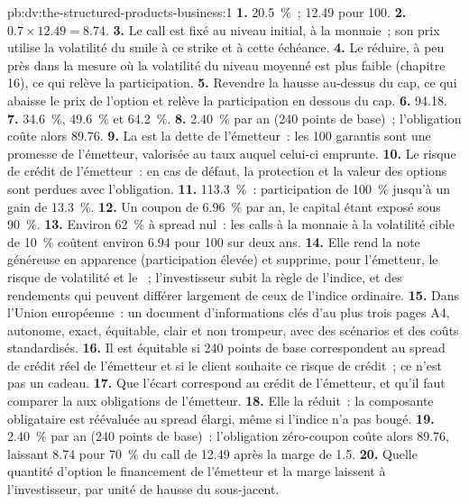 \begin{solution}{pb:dv:the-structured-products-business:1}
\textbf{1.} 20.5~\%~; 12.49 pour 100.
\textbf{2.} $0.7\times12.49=8.74$.
\textbf{3.} Le call est fixé au niveau initial, à la monnaie~; son prix utilise la volatilité du smile à ce strike et à cette échéance.
\textbf{4.} Le réduire, à peu près dans la mesure où la volatilité du niveau moyenné est plus faible (chapitre 16), ce qui relève la participation.
\textbf{5.} Revendre la hausse au-dessus du cap, ce qui abaisse le prix de l'option et relève la participation en dessous du cap.
\textbf{6.} 94.18.
\textbf{7.} 34.6~\%, 49.6~\% et 64.2~\%.
\textbf{8.} 2.40~\% par an (240 points de base)~; l'obligation coûte alors 89.76.
\textbf{9.} La  est la dette de l'émetteur~: les 100 garantis sont une promesse de l'émetteur, valorisée au taux auquel celui-ci emprunte.
\textbf{10.} Le risque de crédit de l'émetteur~: en cas de défaut, la protection et la valeur des options sont perdues avec l'obligation.
\textbf{11.} 113.3~\%~: participation de 100~\% jusqu'à un gain de 13.3~\%.
\textbf{12.} Un coupon de 6.96~\% par an, le capital étant exposé sous 90~\%.
\textbf{13.} Environ 62~\% à spread nul~: les calls à la monnaie à la volatilité cible de 10~\% coûtent environ 6.94 pour 100 sur deux ans.
\textbf{14.} Elle rend la note généreuse en apparence (participation élevée) et supprime, pour l'émetteur, le risque de volatilité et le ~; l'investisseur subit la
règle de l'indice, et des rendements qui peuvent différer largement de ceux de l'indice ordinaire.
\textbf{15.} Dans l'Union européenne~: un document d'informations clés d'au plus trois pages A4, autonome, exact, équitable, clair et non
trompeur, avec des scénarios et des coûts standardisés.
\textbf{16.} Il est équitable si 240 points de base correspondent au spread de crédit réel de l'émetteur et si le client souhaite ce risque de crédit~; ce n'est pas un cadeau.
\textbf{17.} Que l'écart correspond au crédit de l'émetteur, et qu'il faut comparer la  aux obligations de l'émetteur.
\textbf{18.} Elle la réduit~: la composante obligataire est réévaluée au spread élargi, même si l'indice n'a pas bougé.
\textbf{19.} 2.40~\% par an (240 points de base)~: l'obligation zéro-coupon coûte alors 89.76, laissant 8.74 pour 70~\% du call de 12.49 après la marge de 1.5.
\textbf{20.} Quelle quantité d'option le financement de l'émetteur et la marge laissent à l'investisseur, par unité de hausse du sous-jacent.
\end{solution}

